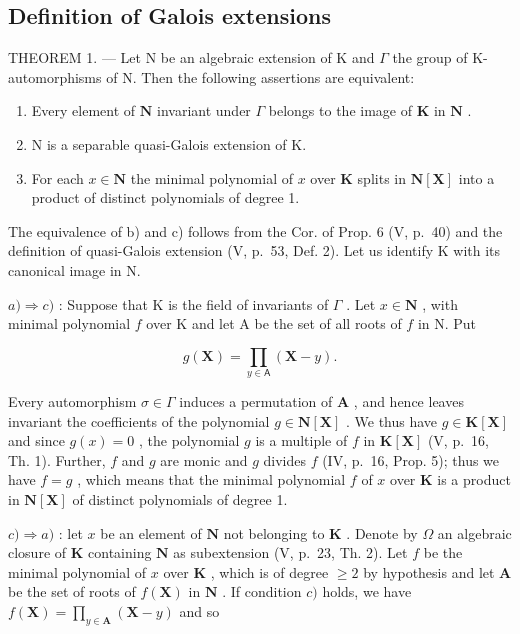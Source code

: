 \subsection{Definition of Galois extensions}

THEOREM 1. --- Let N be an algebraic extension of K and \(\Gamma\) the group of K-automorphisms of N. Then the following assertions are equivalent:

\begin{enumerate}
\def\labelenumi{\alph{enumi})}
\item
  Every element of \(\mathbf{N}\) invariant under \(\Gamma\) belongs to the image of \(\mathbf{K}\) in \(\mathbf{N}\) .
\item
  N is a separable quasi-Galois extension of K.
\item
  For each \(x \in \mathbf{N}\) the minimal polynomial of \(x\) over \(\mathbf{K}\) splits in \(\mathbf{N}[\mathbf{X}]\) into a product of distinct polynomials of degree 1.
\end{enumerate}

The equivalence of b) and c) follows from the Cor. of Prop. 6 (V, p.~40) and the definition of quasi-Galois extension (V, p.~53, Def. 2). Let us identify K with its canonical image in N.

\(a) \Rightarrow c)\) : Suppose that K is the field of invariants of \(\Gamma\) . Let \(x \in \mathbf{N}\) , with minimal polynomial \(f\) over K and let A be the set of all roots of \(f\) in N. Put

\[
g (\mathbf {X}) = \prod_ {y \in \mathsf {A}} (\mathbf {X} - y).
\]

Every automorphism \(\sigma \in \Gamma\) induces a permutation of \(\mathbf{A}\) , and hence leaves invariant the coefficients of the polynomial \(g \in \mathbf{N}[\mathbf{X}]\) . We thus have \(g \in \mathbf{K}[\mathbf{X}]\) and since \(g(x) = 0\) , the polynomial \(g\) is a multiple of \(f\) in \(\mathbf{K}[\mathbf{X}]\) (V, p.~16, Th. 1). Further, \(f\) and \(g\) are monic and \(g\) divides \(f\) (IV, p.~16, Prop. 5); thus we have \(f = g\) , which means that the minimal polynomial \(f\) of \(x\) over \(\mathbf{K}\) is a product in \(\mathbf{N}[\mathbf{X}]\) of distinct polynomials of degree 1.

\(c) \Rightarrow a)\) : let \(x\) be an element of \(\mathbf{N}\) not belonging to \(\mathbf{K}\) . Denote by \(\Omega\) an algebraic closure of \(\mathbf{K}\) containing \(\mathbf{N}\) as subextension (V, p.~23, Th. 2). Let \(f\) be the minimal polynomial of \(x\) over \(\mathbf{K}\) , which is of degree \(\geqslant 2\) by hypothesis and let \(\mathbf{A}\) be the set of roots of \(f(\mathbf{X})\) in \(\mathbf{N}\) . If condition \(c)\) holds, we have \(f(\mathbf{X}) = \prod_{y \in \mathbf{A}} (\mathbf{X} - y)\) and so

